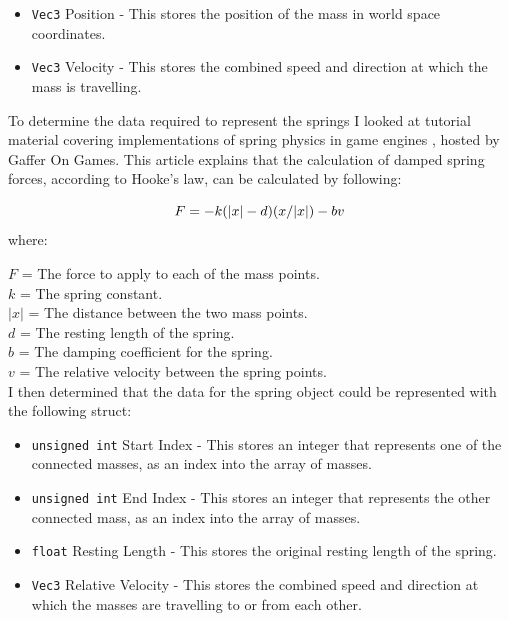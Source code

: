 \documentclass[]{acmsiggraph}
\begin{document}
\begin{itemize}
	\item \lstinline{Vec3} Position - This stores the position of the mass in world space coordinates.
	\item \lstinline{Vec3} Velocity - This stores the combined speed and direction at which the mass is travelling.
\end{itemize}

To determine the data required to represent the springs I looked at tutorial material covering implementations of spring physics in game engines \cite{gafferSpring}, hosted by Gaffer On Games. This article explains that the calculation of damped spring forces, according to Hooke's law, can be calculated by following:

\begin{equation}
	F = -k(|x|-d)(x/|x|) - bv \\
\end{equation}
where:

$F$ = The force to apply to each of the mass points. \\
$k$ = The spring constant. \\
$|x|$ = The distance between the two mass points. \\
$d$ = The resting length of the spring. \\
$b$ = The damping coefficient for the spring. \\
$v$ = The relative velocity between the spring points. \\
I then determined that the data for the spring object could be represented with the following struct:
\begin{itemize}
	\item \lstinline{unsigned int} Start Index - This stores an integer that represents one of the connected masses, as an index into the array of masses.
	\item \lstinline{unsigned int} End Index - This stores an integer that represents the other connected mass, as an index into the array of masses.
	\item \lstinline{float} Resting Length - This stores the original resting length of the spring.
	\item \lstinline{Vec3} Relative Velocity - This stores the combined speed and direction at which the masses are travelling to or from each other.
\end{itemize}
\end{document}
